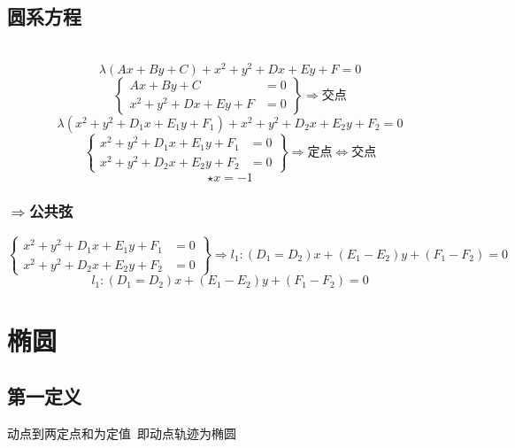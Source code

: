 \documentclass[lang=cn,10pt]{elegantbook}
\begin{document}
     	\subsection{圆系方程}~{}\\
     	\[ \lambda(Ax+By+C)+x^{2}+y^{2}+Dx+Ey+F=0\]
\[
\left\{
\begin{aligned}
	Ax + By + C &= 0 \\
	x^2 + y^2 + Dx + Ey + F &= 0
\end{aligned}
\right\}
\Rightarrow \text{交点}
\]
	\[\]
	\[\]
		\[ \lambda(x^{2}+y^{2}+D_{1}x+E_{1}y+F_{1})+x^{2}+y^{2}+D_{2}x+E_{2}y+F_{2}=0\]
		\[
		\left\{
		\begin{aligned}
			x^{2}+y^{2}+D_{1}x+E_{1}y+F_{1} &= 0 \\
			x^{2}+y^{2}+D_{2}x+E_{2}y+F_{2} &= 0
		\end{aligned}
		\right\}
		\Rightarrow \text{定点}\Leftrightarrow \mbox{交点}
		\]
	\[ \star x=-1\]
	\subsubsection{$\Rightarrow$公共弦}
			$
	\left\{
	\begin{aligned}
		x^{2}+y^{2}+D_{1}x+E_{1}y+F_{1} &= 0 \\
		x^{2}+y^{2}+D_{2}x+E_{2}y+F_{2} &= 0
	\end{aligned}
	\right\}
	\Rightarrow l_{1}:(D_{1}=D_{2})x+(E_{1}-E_{2})y+(F_{1}-F_{2})=0
	$
	\[l_{1}:(D_{1}=D_{2})x+(E_{1}-E_{2})y+(F_{1}-F_{2})=0\]
\section{椭圆}
\subsection{第一定义}
动点到两定点和为定值\ 即动点轨迹为椭圆\\
\end{document}
